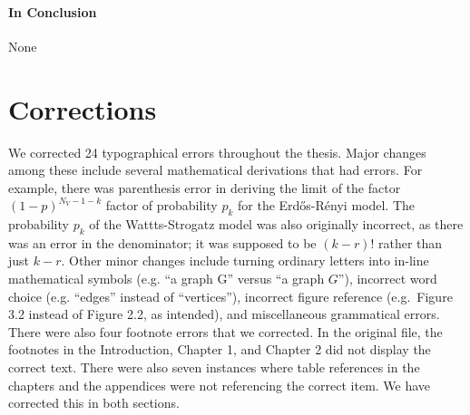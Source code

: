\documentclass[12pt,twoside]{amherstthesis}
\begin{document}
\begin{Shaded}
\begin{Highlighting}[]
  
  
  
  \end{Highlighting}
  \end{Shaded}
  
  \subsubsection{In Conclusion}\label{in-conclusion}
  
  None
  
  \onehalfspacing
  
  \backmatter
  \onehalfspacing
  
  \chapter*{Corrections}\label{corrections}
  
  \setcounter{chapter}{5} \setcounter{section}{0}
  
  We corrected 24 typographical errors throughout the thesis. Major
  changes among these include several mathematical derivations that had
  errors. For example, there was parenthesis error in deriving the limit
  of the factor \((1 - p)^{N_{V} - 1 - k}\) factor of probability
  \(p_{k}\) for the Erdős-Rényi model. The probability \(p_{k}\) of the
  Wattts-Strogatz model was also originally incorrect, as there was an
  error in the denominator; it was supposed to be \((k - r)!\) rather than
  just \(k - r\). Other minor changes include turning ordinary letters
  into in-line mathematical symbols (e.g. ``a graph G'' versus ``a graph
  \(G\)''), incorrect word choice (e.g. ``edges'' instead of
  ``vertices''), incorrect figure reference (e.g.~Figure 3.2 instead of
  Figure 2.2, as intended), and miscellaneous grammatical errors. There
  were also four footnote errors that we corrected. In the original file,
  the footnotes in the Introduction, Chapter 1, and Chapter 2 did not
  display the correct text. There were also seven instances where table
  references in the chapters and the appendices were not referencing the
  correct item. We have corrected this in both sections.
  
\end{document}

